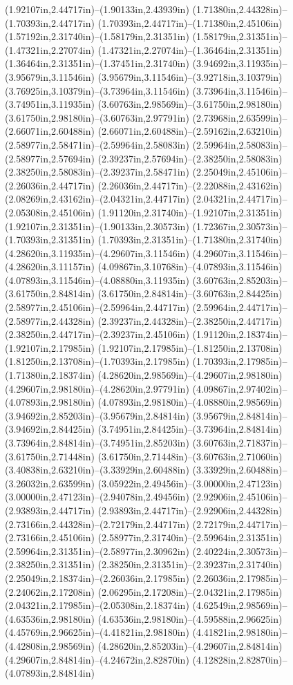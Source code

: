 (1.92107in,2.44717in)--(1.90133in,2.43939in) (1.71380in,2.44328in)--(1.70393in,2.44717in) (1.70393in,2.44717in)--(1.71380in,2.45106in) (1.57192in,2.31740in)--(1.58179in,2.31351in) (1.58179in,2.31351in)--(1.47321in,2.27074in) (1.47321in,2.27074in)--(1.36464in,2.31351in) (1.36464in,2.31351in)--(1.37451in,2.31740in) (3.94692in,3.11935in)--(3.95679in,3.11546in) (3.95679in,3.11546in)--(3.92718in,3.10379in) (3.76925in,3.10379in)--(3.73964in,3.11546in) (3.73964in,3.11546in)--(3.74951in,3.11935in) (3.60763in,2.98569in)--(3.61750in,2.98180in) (3.61750in,2.98180in)--(3.60763in,2.97791in) (2.73968in,2.63599in)--(2.66071in,2.60488in) (2.66071in,2.60488in)--(2.59162in,2.63210in) (2.58977in,2.58471in)--(2.59964in,2.58083in) (2.59964in,2.58083in)--(2.58977in,2.57694in) (2.39237in,2.57694in)--(2.38250in,2.58083in) (2.38250in,2.58083in)--(2.39237in,2.58471in) (2.25049in,2.45106in)--(2.26036in,2.44717in) (2.26036in,2.44717in)--(2.22088in,2.43162in) (2.08269in,2.43162in)--(2.04321in,2.44717in) (2.04321in,2.44717in)--(2.05308in,2.45106in) (1.91120in,2.31740in)--(1.92107in,2.31351in) (1.92107in,2.31351in)--(1.90133in,2.30573in) (1.72367in,2.30573in)--(1.70393in,2.31351in) (1.70393in,2.31351in)--(1.71380in,2.31740in) (4.28620in,3.11935in)--(4.29607in,3.11546in) (4.29607in,3.11546in)--(4.28620in,3.11157in) (4.09867in,3.10768in)--(4.07893in,3.11546in) (4.07893in,3.11546in)--(4.08880in,3.11935in) (3.60763in,2.85203in)--(3.61750in,2.84814in) (3.61750in,2.84814in)--(3.60763in,2.84425in) (2.58977in,2.45106in)--(2.59964in,2.44717in) (2.59964in,2.44717in)--(2.58977in,2.44328in) (2.39237in,2.44328in)--(2.38250in,2.44717in) (2.38250in,2.44717in)--(2.39237in,2.45106in) (1.91120in,2.18374in)--(1.92107in,2.17985in) (1.92107in,2.17985in)--(1.81250in,2.13708in) (1.81250in,2.13708in)--(1.70393in,2.17985in) (1.70393in,2.17985in)--(1.71380in,2.18374in) (4.28620in,2.98569in)--(4.29607in,2.98180in) (4.29607in,2.98180in)--(4.28620in,2.97791in) (4.09867in,2.97402in)--(4.07893in,2.98180in) (4.07893in,2.98180in)--(4.08880in,2.98569in) (3.94692in,2.85203in)--(3.95679in,2.84814in) (3.95679in,2.84814in)--(3.94692in,2.84425in) (3.74951in,2.84425in)--(3.73964in,2.84814in) (3.73964in,2.84814in)--(3.74951in,2.85203in) (3.60763in,2.71837in)--(3.61750in,2.71448in) (3.61750in,2.71448in)--(3.60763in,2.71060in) (3.40838in,2.63210in)--(3.33929in,2.60488in) (3.33929in,2.60488in)--(3.26032in,2.63599in) (3.05922in,2.49456in)--(3.00000in,2.47123in) (3.00000in,2.47123in)--(2.94078in,2.49456in) (2.92906in,2.45106in)--(2.93893in,2.44717in) (2.93893in,2.44717in)--(2.92906in,2.44328in) (2.73166in,2.44328in)--(2.72179in,2.44717in) (2.72179in,2.44717in)--(2.73166in,2.45106in) (2.58977in,2.31740in)--(2.59964in,2.31351in) (2.59964in,2.31351in)--(2.58977in,2.30962in) (2.40224in,2.30573in)--(2.38250in,2.31351in) (2.38250in,2.31351in)--(2.39237in,2.31740in) (2.25049in,2.18374in)--(2.26036in,2.17985in) (2.26036in,2.17985in)--(2.24062in,2.17208in) (2.06295in,2.17208in)--(2.04321in,2.17985in) (2.04321in,2.17985in)--(2.05308in,2.18374in) (4.62549in,2.98569in)--(4.63536in,2.98180in) (4.63536in,2.98180in)--(4.59588in,2.96625in) (4.45769in,2.96625in)--(4.41821in,2.98180in) (4.41821in,2.98180in)--(4.42808in,2.98569in) (4.28620in,2.85203in)--(4.29607in,2.84814in) (4.29607in,2.84814in)--(4.24672in,2.82870in) (4.12828in,2.82870in)--(4.07893in,2.84814in) 